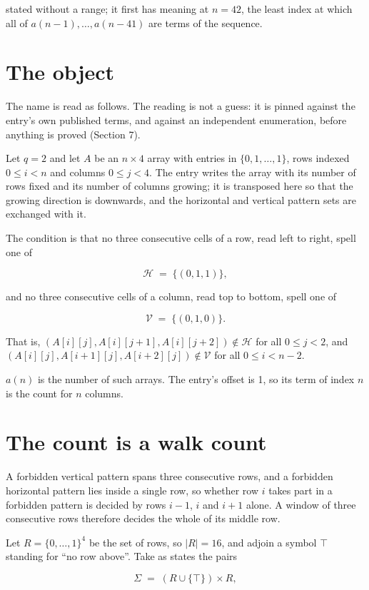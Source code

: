 \documentclass[11pt]{article}
\theoremstyle{definition}
\begin{document}
stated without a range; it first has meaning at $n = 42$, the least index at which all of $a(n-1),\dots,a(n-41)$ are terms of the sequence.

\section{The object}

The name is read as follows. The reading is not a guess: it is pinned against the entry's own published terms, and against an independent enumeration, before anything is proved (Section 7).

Let $q = 2$ and let $A$ be an $n \times 4$ array with entries in $\{0,1,\dots,1\}$, rows indexed $0 \le i < n$ and columns $0 \le j < 4$. The entry writes the array with its number of rows fixed and its number of columns growing; it is transposed here so that the growing direction is downwards, and the horizontal and vertical pattern sets are exchanged with it.

The condition is that no three consecutive cells of a row, read left to right, spell one of

\[\mathcal{H} \;=\; \{(0,1,1)\},\]

and no three consecutive cells of a column, read top to bottom, spell one of

\[\mathcal{V} \;=\; \{(0,1,0)\}.\]

That is, $(A[i][j],A[i][j{+}1],A[i][j{+}2]) \notin \mathcal{H}$ for all $0 \le j < 2$, and $(A[i][j],A[i{+}1][j],A[i{+}2][j]) \notin \mathcal{V}$ for all $0 \le i < n-2$.

$a(n)$ is the number of such arrays. The entry's offset is 1, so its term of index $n$ is the count for $n$ columns.

\section{The count is a walk count}

A forbidden vertical pattern spans three consecutive rows, and a forbidden horizontal pattern lies inside a single row, so whether row $i$ takes part in a forbidden pattern is decided by rows $i-1$, $i$ and $i+1$ alone. A window of three consecutive rows therefore decides the whole of its middle row.

Let $R = \{0,\dots,1\}^{4}$ be the set of rows, so $|R| = 16$, and adjoin a symbol $\top$ standing for ``no row above''. Take as states the pairs

\[\Sigma \;=\; (R \cup \{\top\}) \times R,\]
\end{document}
